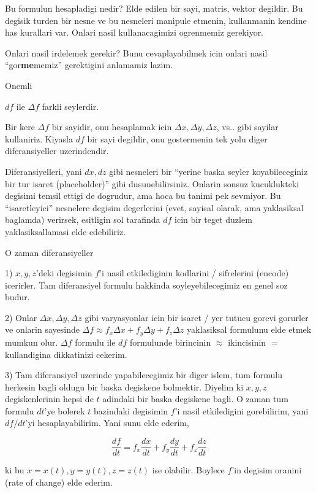 \documentclass[12pt,fleqn]{article}\usepackage{../common}
\begin{document}
Bu formulun hesapladigi nedir? Elde edilen bir sayi, matris, vektor
degildir. Bu degisik turden bir nesne ve bu nesneleri manipule etmenin,
kullanmanin kendine has kurallari var. Onlari nasil kullanacagimizi
ogrenmemiz gerekiyor. 

Onlari nasil irdelemek gerekir? Bunu cevaplayabilmek icin onlari nasil
``gor\textbf{me}memiz'' gerektigini anlamamiz lazim. 

Onemli

$df$ ile $\Delta f$ farkli seylerdir.

Bir kere $\Delta f$ bir sayidir, onu hesaplamak icin $\Delta x, \Delta y,
\Delta z$, vs.. gibi 
sayilar kullaniriz. Kiyasla $df$ bir sayi degildir, onu gostermenin 
tek yolu diger diferansiyeller uzerindendir. 

Diferansiyelleri, yani $dx, dz$ gibi nesneleri bir ``yerine baska seyler
koyabileceginiz bir tur isaret (placeholder)'' gibi
dusunebilirsiniz. Onlarin sonsuz kucuklukteki degisimi temsil ettigi de
dogrudur, ama hoca bu tanimi pek sevmiyor. Bu ``isaretleyici'' nesnelere
degisim degerlerini (evet, sayisal olarak, ama yaklasiksal baglamda) verirsek,
esitligin sol tarafinda $df$ icin bir teget duzlem yaklasiksallamasi elde
edebiliriz. 

O zaman diferansiyeller 

1) $x,y,z$'deki degisimin $f$'i nasil etkilediginin kodlarini / sifrelerini
(encode) icerirler. Tam diferansiyel formulu hakkinda soyleyebilecegimiz en
genel soz budur.

2) Onlar $\Delta x, \Delta
y, \Delta z$ gibi varyasyonlar icin bir isaret / yer tutucu 
gorevi gorurler ve onlarin sayesinde $\Delta f \approx f_x\Delta x + f_y \Delta y + f_z
\Delta z$ 
yaklasiksal formulunu elde etmek mumkun olur. $\Delta f$ formulu ile $df$ 
formulunde birincinin $\approx$ ikincisinin $=$ kullandigina dikkatinizi cekerim.

3) Tam diferansiyel uzerinde yapabilecegimiz bir diger islem, tum formulu
herkesin bagli oldugu bir baska degiskene bolmektir. Diyelim ki $x,y,z$
degiskenlerinin hepsi de $t$ adindaki bir baska degiskene bagli. O zaman
tum formulu $dt$'ye bolerek $t$ bazindaki degisimin $f$'i nasil
etkiledigini gorebilirim, yani $df/dt$'yi hesaplayabilirim. Yani sunu elde
ederim, 

\[ \frac{df}{dt} = f_x\frac{dx}{dt} + f_y\frac{dy}{dt} + f_z\frac{dz}{dt} \]

ki bu $x=x(t),y=y(t),z=z(t)$ ise olabilir. Boylece $f$'in degisim oranini
(rate of change) elde ederim. 
\end{document}
